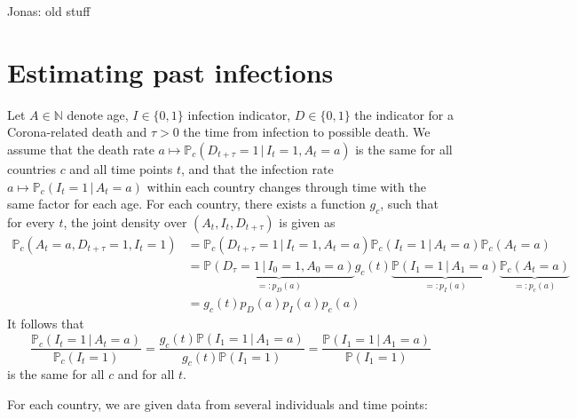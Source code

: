 \documentclass[a4paper]{article}
\newcommand\N{\mathbb{N}}
\renewcommand\P{\mathbb{P}}
\newcommand{\given}{\, \vert \,}
\newcommand\Jonas[1]{{\color{red}Jonas: #1}}
\begin{document}
\Jonas{old stuff

\section{Estimating past infections}

Let $A \in \N$ denote age, $I \in \{0,1\}$ infection indicator, $D \in \{0,1\}$ the indicator for a Corona-related death and $\tau > 0$
the time from infection to possible death. We assume that the death rate $a \mapsto \P_c(D_{t+\tau} = 1 \given I_t = 1, A_t = a)$ is 
the same for all countries $c$ and all time points $t$, and that the infection rate $a \mapsto \P_c(I_{t} = 1 \given A_t = a)$ within 
each country changes through time with the same factor for each age. For each country, there exists a function $g_c$, such that for every $t$, the joint
density over $(A_t,I_t,D_{t+\tau})$ is given as
%
\begin{align*}
\P_c(A_t = a, D_{t+\tau} = 1, I_t = 1)	&= \P_c(D_{t+\tau} = 1 \given I_t = 1, A_t = a)  \P_c(I_t = 1 \given A_t = a) \P_c(A_t = a) \\
															&= \underbrace{\P(D_{\tau} = 1 \given I_0 = 1, A_0 = a)}_{=:p_D(a)} g_c(t) \underbrace{\P(I_1 = 1 \given A_1 = a)}_{=:p_I(a)} \underbrace{\P_c(A_t = a)}_{=:p_c(a)} \\
															&=  g_c(t) p_D(a) p_I(a) p_c(a)
\end{align*}
%
It follows that 
$$
\frac{\P_c(I_t = 1 \given A_t = a)}{\P_c(I_t = 1)} = \frac{g_c(t) \P(I_1 = 1 \given A_1 = a)}{g_c(t) \P(I_1 = 1)} = \frac{\P(I_1 = 1 \given A_1 = a)}{ \P(I_1 = 1)}
$$
is the same for all $c$ and for all $t$. 


For each country, we are given data from several individuals and time points:

}
\end{document}
